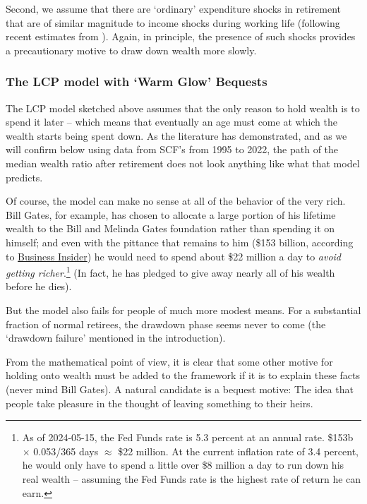 \documentclass{article}
\begin{document}
Second, we assume that there are `ordinary' expenditure shocks in retirement that are of similar magnitude to income shocks during working life (following recent estimates from  \cite{flExpShocks}).  Again, in principle, the presence of such shocks provides a precautionary motive to draw down wealth more slowly.

\subsubsection{The LCP model with `Warm Glow' Bequests}

The LCP model sketched above assumes that the only reason to hold wealth is to spend it later -- which means that eventually an age must come at which the wealth starts being spent down. As the literature has demonstrated, and as we will confirm below using data from SCF's from 1995 to 2022, the path of the median wealth ratio after retirement does not look anything like what that model predicts.

Of course, the model can make no sense at all of the behavior of the very rich. Bill Gates, for example, has chosen to allocate a large portion of his lifetime wealth to the Bill and Melinda Gates foundation rather than spending it on himself; and even with the pittance that remains to him (\$153 billion, according to \href{https://www.businessinsider.com/how-bill-gates-spends-fortune}{Business Insider}) he would need to spend about \$22 million a day to \textit{avoid getting richer}.\footnote{As of 2024-05-15, the Fed Funds rate is 5.3 percent at an annual rate. \$153b $\times$ 0.053/365 days $\approx$ \$22 million. At the current inflation rate of 3.4 percent, he would only have to spend a little over \$8 million a day to run down his real wealth -- assuming the Fed Funds rate is the highest rate of return he can earn.}  (In fact, he has pledged to give away nearly all of his wealth before he dies).

But the model also fails for people of much more modest means.  For a substantial fraction of normal retirees, the drawdown phase seems never to come (the `drawdown failure' mentioned in the introduction).

From the mathematical point of view, it is clear that some other motive for holding onto wealth must be added to the framework if it is to explain these facts (never mind Bill Gates). A natural candidate is a bequest motive: The idea that people take pleasure in the thought of leaving something to their heirs.
\end{document}
